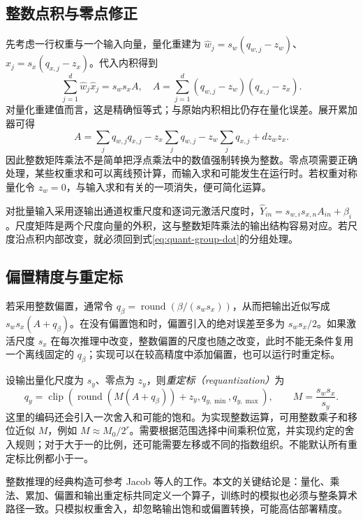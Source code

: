 \documentclass[UTF8,12pt,a4paper,fontset=fandol]{ctexart}
\begin{document}
\subsection{整数点积与零点修正}
先考虑一行权重与一个输入向量，量化重建为 $\widehat w_j=s_w(q_{w,j}-z_w)$、$\widehat x_j=s_x(q_{x,j}-z_x)$。代入内积得到
\begin{equation}
 \sum_{j=1}^d\widehat w_j\widehat x_j=s_ws_x A,
 \quad A=\sum_{j=1}^d(q_{w,j}-z_w)(q_{x,j}-z_x).
 \label{eq:quant-int-dot}
\end{equation}
对量化重建值而言，这是精确恒等式；与原始内积相比仍存在量化误差。展开累加器可得
\begin{equation}
 A=\sum_jq_{w,j}q_{x,j}-z_x\sum_jq_{w,j}
 -z_w\sum_jq_{x,j}+d z_wz_x.
 \label{eq:quant-zero-correction}
\end{equation}
因此整数矩阵乘法不是简单把浮点乘法中的数值强制转换为整数。零点项需要正确处理，某些权重求和可以离线预计算，而输入求和可能发生在运行时。若权重对称量化令 $z_w=0$，与输入求和有关的一项消失，便可简化运算。

对批量输入采用逐输出通道权重尺度和逐词元激活尺度时，$\widehat Y_{in}=s_{w,i}s_{x,n}A_{in}+\beta_i$。尺度矩阵是两个尺度向量的外积，这与整数矩阵乘法的输出结构容易对应。若尺度沿点积内部改变，就必须回到式\eqref{eq:quant-group-dot}的分组处理。

\subsection{偏置精度与重定标}
若采用整数偏置，通常令 $q_\beta=\operatorname{round}(\beta/(s_ws_x))$，从而把输出近似写成 $s_ws_x(A+q_\beta)$。在没有偏置饱和时，偏置引入的绝对误差至多为 $s_ws_x/2$。如果激活尺度 $s_x$ 在每次推理中改变，整数偏置的尺度也随之改变，此时不能无条件复用一个离线固定的 $q_\beta$；实现可以在较高精度中添加偏置，也可以运行时重定标。

设输出量化尺度为 $s_y$、零点为 $z_y$，则\emph{重定标（requantization）}为
\begin{equation}
 q_y=\operatorname{clip}\!\left(
 \operatorname{round}\!\left(M(A+q_\beta)\right)+z_y,
 q_{y,\min},q_{y,\max}\right),\qquad M=\frac{s_ws_x}{s_y}.
 \label{eq:quant-requant}
\end{equation}
这里的编码还会引入一次舍入和可能的饱和。为实现整数运算，可用整数乘子和移位近似 $M$，例如 $M\approx M_0/2^r$。需要根据范围选择中间乘积位宽，并实现约定的舍入规则；对于大于一的比例，还可能需要左移或不同的指数组织。不能默认所有重定标比例都小于一。

整数推理的经典构造可参考 Jacob 等人的工作\cite{jacob2018}。本文的关键结论是：量化、乘法、累加、偏置和输出重定标共同定义一个算子，训练时的模拟也必须与整条算术路径一致。只模拟权重舍入，却忽略输出饱和或偏置转换，可能高估部署精度。
\end{document}
